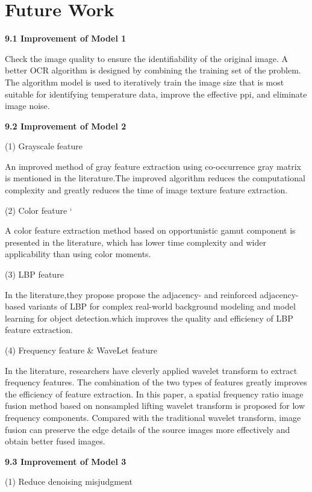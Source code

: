 \documentclass{apmcmthesis}
\begin{document}
\section{Future Work}

\noindent\textbf{9.1 Improvement of Model 1}


Check the image quality to ensure the identifiability of the original image. A better OCR algorithm is designed by combining the training set of the problem. The algorithm model is used to iteratively train the image size that is most suitable for identifying temperature data, improve the effective ppi, and eliminate image noise.


\noindent\textbf{9.2 Improvement of Model 2}


\noindent(1) Grayscale feature 

An improved method of gray feature extraction using co-occurrence gray matrix is mentioned in the literature\cite{gjq}.The improved algorithm reduces the computational complexity and greatly reduces the time of image texture feature extraction.


\noindent(2) Color feature `

A color feature extraction method based on opportunistic gamut component is presented in the literature\cite{chen2010adaptive}, which has lower time complexity and wider applicability than using color moments.

\noindent(3) LBP feature 

In the literature\cite{acharya2021adjacent},they propose propose the adjacency- and reinforced adjacency-based variants of LBP for complex real-world background modeling and model learning for object detection.which improves the quality and efficiency of LBP feature extraction.

\noindent(4) Frequency feature \& WaveLet feature 

In the literature\cite{yjz2009}, researchers have cleverly applied wavelet transform to extract frequency features. The combination of the two types of features greatly improves the efficiency of feature extraction. In this paper, a spatial frequency ratio image fusion method based on nonsampled lifting wavelet transform is proposed for low frequency components. Compared with the traditional wavelet transform, image fusion can preserve the edge details of the source images more effectively and obtain better fused images.


\noindent\textbf{9.3 Improvement of Model 3}

\noindent(1) Reduce denoising misjudgment
\end{document}
